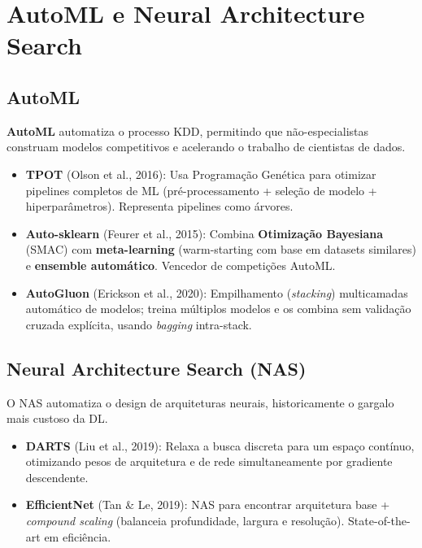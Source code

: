 \documentclass[12pt,a4paper]{article}
\begin{document}
\section{AutoML e Neural Architecture Search}

\subsection{AutoML}

\textbf{AutoML} automatiza o processo KDD, permitindo que não-especialistas construam modelos competitivos e acelerando o trabalho de cientistas de dados.

\begin{itemize}
  \item \textbf{TPOT} (Olson et al., 2016): Usa Programação Genética para otimizar pipelines completos de ML (pré-processamento + seleção de modelo + hiperparâmetros). Representa pipelines como árvores.
  \item \textbf{Auto-sklearn} (Feurer et al., 2015): Combina \textbf{Otimização Bayesiana} (SMAC) com \textbf{meta-learning} (warm-starting com base em datasets similares) e \textbf{ensemble automático}. Vencedor de competições AutoML.
  \item \textbf{AutoGluon} (Erickson et al., 2020): Empilhamento (\textit{stacking}) multicamadas automático de modelos; treina múltiplos modelos e os combina sem validação cruzada explícita, usando \textit{bagging} intra-stack.
\end{itemize}

\subsection{Neural Architecture Search (NAS)}

O NAS automatiza o design de arquiteturas neurais, historicamente o gargalo mais custoso da DL.

\begin{itemize}
  \item \textbf{DARTS} (Liu et al., 2019): Relaxa a busca discreta para um espaço contínuo, otimizando pesos de arquitetura e de rede simultaneamente por gradiente descendente.
  \item \textbf{EfficientNet} (Tan \& Le, 2019): NAS para encontrar arquitetura base + \textit{compound scaling} (balanceia profundidade, largura e resolução). State-of-the-art em eficiência.
\end{itemize}
\end{document}
